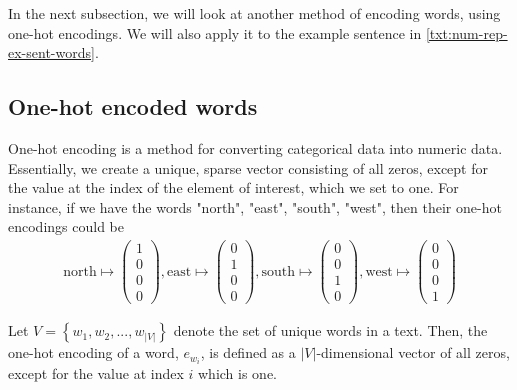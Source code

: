 In the next subsection, we will look at another method of encoding words, using one-hot encodings. We will also apply it to the example sentence in \cref{txt:num-rep-ex-sent-words}.

\subsection{One-hot encoded words}
One-hot encoding is a method for converting categorical data into numeric data. Essentially, we create a unique, sparse vector consisting of all zeros, except for the value at the index of the element of interest, which we set to one. For instance, if we have the words "north", "east", "south", "west", then their one-hot encodings could be
\begin{align}
    \text{north} \mapsto \begin{pmatrix}
    1\\
    0\\
    0\\
    0
    \end{pmatrix},
    \text{east} \mapsto \begin{pmatrix}
    0\\
    1\\
    0\\
    0
    \end{pmatrix},
    \text{south} \mapsto \begin{pmatrix}
    0\\
    0\\
    1\\
    0
    \end{pmatrix},
    \text{west} \mapsto \begin{pmatrix}
    0\\
    0\\
    0\\
    1
    \end{pmatrix}
\end{align}

\begin{definition}
Let $V = \left \{ w_1, w_2, ..., w_{|V|} \right \}$ denote the set of unique words in a text. Then, the one-hot encoding of a word, $e_{w_i}$, is defined as a $|V|$-dimensional vector of all zeros, except for the value at index $i$ which is one. \label{def:one-hot-encoding}
\end{definition}

